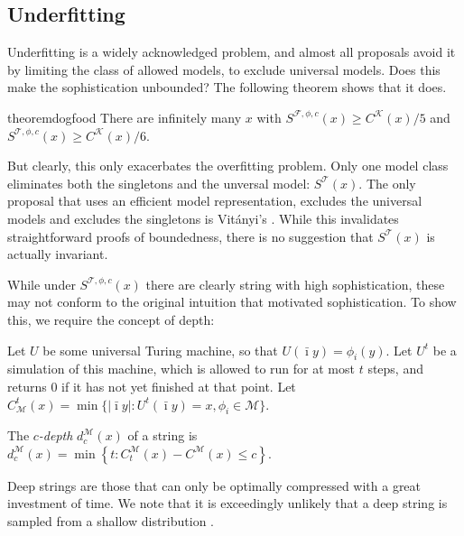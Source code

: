 \documentclass{style/llncs}
\newcommand{\M}{\mathscr M}
\newcommand{\T}{\mathscr T}
\newcommand{\F}{\mathscr F}
\newcommand{\K}{\mathscr K}
\newcommand{\s}{S}
\begin{document}
\subsection{Underfitting}

Underfitting is a widely acknowledged problem, and almost all proposals avoid it by limiting the class of allowed models, to exclude universal models. Does this make the sophistication unbounded? The following theorem shows that it does.

\begin{restatable}{theorem}{dogfood}
There are infinitely many $x$ with $\s^{\F,\phi,c}(x) \geq C^{\K}(x)/5$ and $\s^{\T,\phi,c}(x) \geq C^{\K}(x)/6$. 
\end{restatable} 

But clearly, this only exacerbates the overfitting problem. Only one model class eliminates both the singletons and the unversal model: $S^\T(x)$. The only proposal that uses an efficient model representation, excludes the universal models and excludes the singletons is Vit\'anyi's \cite{vitanyi2004meaningful}. While this invalidates straightforward proofs of boundedness, there is no suggestion that $S^\T(x)$ is actually invariant.

While under $S^{\T, \phi, c}(x)$ there are clearly string with high sophistication, these may not conform to the original intuition that motivated sophistication. To show this, we require the concept of depth:

\begin{definition}\belowdisplayskip=-12pt
Let $U$ be some universal Turing machine, so that $U(\bar\imath y) = \phi_i(y)$. Let $U^t$ be a simulation of this machine, which is allowed to run for at most $t$ steps, and returns $0$ if it has not yet finished at that point. Let $C^t_\M(x) = \min\{|\bar\imath y| : U^t(\bar\imath y) = x, \phi_i \in \M\}$.

The \emph{$c$-depth} $d^\M_c(x)$ of a string is $d^\M_c(x) = \min \left\{t : C^\M_t(x) - C^\M(x) \leq c \right\}$.
\end{definition}

Deep strings are those that can only be optimally compressed with a great investment of time. We note that it is exceedingly unlikely that a deep string is sampled from a shallow distribution \cite{bloem2014safe,bennett1988logical}.
 
\end{document}
